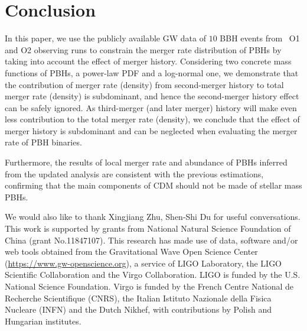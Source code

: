 \documentclass[
reprint,           %
superscriptaddress,%
amsmath,           %
amssymb,           %
aps,               %
prd,               %
notitlepage,       %
longbibliography,  %
floatfix,          %
showkeys,          %
]{revtex4-1}
\begin{document}
\section{\label{conclusion}Conclusion}

In this paper, we use the publicly available GW data of $10$ BBH events from 
\lvc\ O1 and O2 observing runs to constrain the merger rate distribution 
of PBHs by taking into account the effect of merger history.
Considering two concrete mass functions of PBHs, a power-law PDF and 
a log-normal one, we demonstrate that the contribution of merger rate (density)
from second-merger history to total merger rate (density) is 
subdominant, and hence the second-merger history effect can be safely ignored.
As third-merger (and later merger) history will make even less contribution to 
the total merger rate (density), we conclude that the effect of merger history
is subdominant and can be neglected when evaluating the merger rate of PBH
binaries.

Furthermore, the results of local merger rate and abundance of PBHs inferred from the updated
analysis are consistent with the previous estimations, 
confirming that the main components of CDM should not be made of stellar 
mass PBHs. 

\begin{acknowledgments}
We would also like to thank Xingjiang Zhu, Shen-Shi Du for useful conversations.
This work is supported by grants from National Natural Science Foundation of China (grant No.11847107). 
This research has made use of data, software and/or web tools obtained 
from the Gravitational Wave Open Science Center \cite{Vallisneri:2014vxa}
(\url{https://www.gw-openscience.org}), a service of LIGO Laboratory, 
the LIGO Scientific Collaboration and the Virgo Collaboration. 
LIGO is funded by the U.S. National Science Foundation. 
Virgo is funded by the French Centre National de Recherche Scientifique (CNRS),
the Italian Istituto Nazionale della Fisica Nucleare (INFN) and the Dutch Nikhef,
with contributions by Polish and Hungarian institutes. 
\end{acknowledgments}	
	

\end{document}
